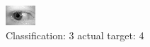 \begin{figure}[h!]
\begin{center}
\includegraphics[width=0.60\columnwidth]{figures/ID710_class_3_target_4.png}
\end{center}
\caption{ Classification: 3 actual target: 4}
\label{fig:ID710_class_3_target_4}
\end{figure}
